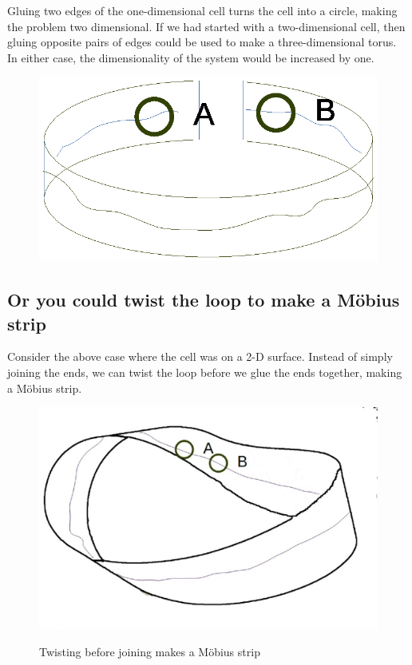 \documentclass[preprint]{iucr}              %
\numberwithin{equation}{section}
\begin{document}
     Gluing two edges of the one-dimensional cell
	turns the cell into a circle, making the problem
	two dimensional. 	If 
	we had started with a two-dimensional cell,
	then gluing opposite pairs of edges could be used to
	make a three-dimensional torus. In either case, the dimensionality of the system
	would be increased by one. 
\begin{figure}
	\includegraphics[width=\textwidth]{loop}		
	\label{loop}
	\caption{}
\end{figure}

\subsection{Or you could twist the loop to make a M{\"o}bius strip}

Consider the above case where the cell was on a 2-D surface.
Instead of simply joining the ends, we can twist the loop before
we glue the ends together, making a M{\"o}bius strip.



\begin{figure}
	\includegraphics[height=0.45\textwidth]{mobius_1}
	\label{mobius_1}
	\caption{Twisting before joining makes a M{\"o}bius strip}
\end{figure}
\end{document}
